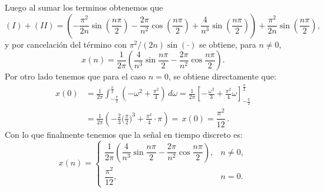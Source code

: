 \documentclass[
  11pt,
  letterpaper,
   addpoints,
   answers
  ]{exam}
\begin{document}
\begin{questions}
\begin{solution}
Luego al sumar los terminos obtenemos que 
\[
(I)+(II)=\left(-\frac{\pi^2}{2n}\sin\!\left(\frac{n\pi}{2}\right)-\frac{2\pi}{n^2}\cos\!\left(\frac{n\pi}{2}\right)+\frac{4}{n^3}\sin\!\left(\frac{n\pi}{2}\right)\right)
+\frac{\pi^2}{2n}\sin\!\left(\frac{n\pi}{2}\right),
\]
y por cancelación del término con $\pi^2/(2n)\sin(\cdot)$ se obtiene, para $n\neq 0$,
\[
x(n)=\frac{1}{2\pi}\left(\frac{4}{n^3}\sin\!\frac{n\pi}{2}-\frac{2\pi}{n^2}\cos\!\frac{n\pi}{2}\right).
\]
Por otro lado tenemos que para el caso $n=0$, se obtiene directamente que: 
\begin{align*}
x(0)
&=\frac{1}{2\pi}\int_{-\frac{\pi}{2}}^{\frac{\pi}{2}}\left(-\omega^2+\frac{\pi^2}{4}\right)\,d\omega
=\frac{1}{2\pi}\left[-\frac{\omega^3}{3}+\frac{\pi^2}{4}\omega\right]_{-\frac{\pi}{2}}^{\frac{\pi}{2}}\\[1mm]
&=\frac{1}{2\pi}\left(-\frac{2}{3}\Big(\tfrac{\pi}{2}\Big)^3+\frac{\pi^2}{4}\cdot\pi\right)
=\boxed{\,x(0)=\dfrac{\pi^2}{12}\,}.
\end{align*}
Con lo que finalmente tenemos que la señal en tiempo discreto es:
\[
x(n)=
\begin{cases}
\dfrac{1}{2\pi}\!\left(\dfrac{4}{n^3}\sin\!\dfrac{n\pi}{2}-\dfrac{2\pi}{n^2}\cos\!\dfrac{n\pi}{2}\right), & n\neq 0,\\[3mm]
\dfrac{\pi^2}{12}, & n=0.
\end{cases}
\]

\begin{figure}[H]
\centering
{}
\end{figure}
\end{solution}
\end{questions}
\end{document}
